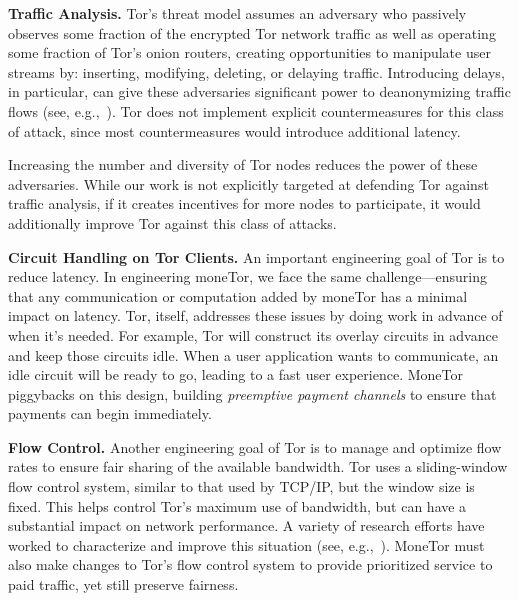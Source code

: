 \textbf{Traffic Analysis.}
Tor's threat model assumes an adversary who passively observes some fraction of the encrypted Tor network traffic as well as operating some fraction of Tor's onion routers, creating opportunities to manipulate user streams by: inserting, modifying, deleting, or delaying traffic.
Introducing delays, in particular, can give these adversaries significant power to deanonymizing traffic flows (see, e.g.,~\cite{fu2009one,rochet2018dropping}).
Tor does not implement explicit countermeasures for this class of attack, since most countermeasures would introduce additional latency.

Increasing the number and diversity of Tor nodes reduces the power of these adversaries.
While our work is not explicitly targeted at defending Tor against traffic analysis, if it creates incentives for more nodes to participate, it would additionally improve Tor against this class of attacks.

\medskip \noindent \textbf{Circuit Handling on Tor Clients.}
An important engineering goal of Tor is to reduce latency.
In engineering moneTor, we face the same challenge---ensuring that any communication or computation added by moneTor has a minimal impact on latency.
Tor, itself, addresses these issues by doing work in advance of when it's needed.
For example, Tor will construct its overlay circuits in advance and keep those circuits idle.
When a user application wants to communicate, an idle circuit will be ready to go, leading to a fast user experience.
MoneTor piggybacks on this design, building {\em preemptive payment channels} to ensure that payments can begin immediately.

\medskip \noindent\textbf{Flow Control.}
Another engineering goal of Tor is to manage and optimize flow rates to ensure fair sharing of the available bandwidth.
Tor uses a sliding-window flow control system, similar to that used by TCP/IP, but the window size is fixed.
This helps control Tor's maximum use of bandwidth, but can have a substantial impact on network performance.
A variety of research efforts have worked to characterize and improve this situation (see, e.g.,~\cite{pets2011-defenestrator,mind-the-gap-2016}).
MoneTor must also make changes to Tor's flow control system to provide prioritized service to paid traffic, yet still preserve fairness.

